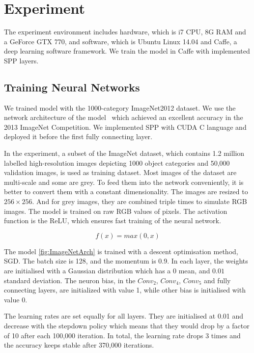 
\chapter{Experiment} %
\label{Chapter4}

The experiment environment includes hardware, which is i7 CPU, 8G RAM and a GeForce GTX 770, and software, which is Ubuntu Linux 14.04 and Caffe\citep{jia2014caffe}, a deep learning software framework. We train the model in Caffe with implemented SPP layers.

\section{Training Neural Networks}

We trained model with the 1000-category ImageNet2012 dataset. We use the network architecture of the model~\cite{ZeilerF13} which achieved an excellent accuracy in the 2013 ImageNet Competition. We implemented SPP with CUDA C language and deployed it before the first fully connecting layer.

In the experiment, a subset of the ImageNet dataset, which contains 1.2 million labelled high-resolution images depicting 1000 object categories and 50,000 validation images, is used as training dataset. Most images of the dataset are multi-scale and some are grey. To feed them into the network conveniently, it is better to convert them with a constant dimensionality. The images are resized to $256\times256$. And for grey images, they are combined triple times to simulate RGB images. The model is trained on raw RGB values of pixels. The activation function is the ReLU, which ensures fast training of the neural network.

\begin{equation}\label{eq:ReLU}
f(x) = max(0, x)
\end{equation}

The model \ref{fig:ImageNetArch} is trained with a descent optimisation method, SGD. The batch size is 128, and the momentum is 0.9.  In each layer, the weights are initialised with a Gaussian distribution which has  a $0$ mean, and $0.01$ standard deviation. The neuron bias, in the $Conv_{2}$, $Conv_{4}$, $Conv_{5}$ and fully connecting layers, are initialized with value 1, while other bias is initialised with value 0.

The learning rates are set equally for all layers. They are initialised at 0.01 and decrease with the stepdown policy which means that they would drop by a factor of 10 after each 100,000 iteration. In total, the learning rate drops 3 times and the accuracy keeps stable after 370,000 iterations. 

